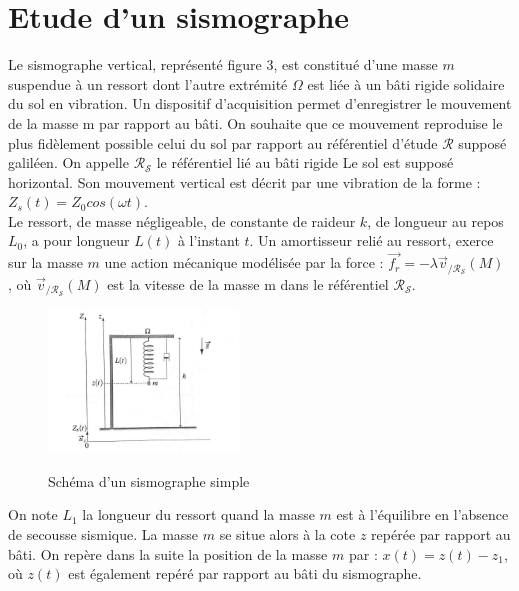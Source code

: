 \documentclass{article}
\begin{document}
\section{ Etude d'un sismographe}

Le sismographe vertical, représenté figure 3, est constitué d’une masse $m$ suspendue à
un ressort dont l’autre extrémité $\Omega$ est liée à un bâti rigide solidaire du sol en vibration. Un
dispositif d’acquisition permet d’enregistrer le mouvement de la masse m par rapport au bâti.
On souhaite que ce mouvement reproduise le plus fidèlement possible celui du sol par rapport
au référentiel d’étude $\mathcal{R}$ supposé galiléen. On appelle $\mathcal{R_S}$ le référentiel lié au bâti rigide
Le sol est supposé horizontal. Son mouvement vertical est décrit par une vibration de la
forme : $Z_s(t)= Z_0 cos(\omega t ).$ \\ 
Le ressort, de masse négligeable, de constante de raideur $k$, de longueur au repos $L_0$, a pour
longueur $L(t)$ à l’instant $t$. Un amortisseur relié au ressort, exerce sur la masse $m$ une action
mécanique modélisée par la force : $\vec{f_r}=-\lambda \vec{v}_{ / \mathcal{R_S}} (M) $ , où $\vec{v}_{ / \mathcal{R_S}} (M) $ est la vitesse de la masse
m dans le référentiel $\mathcal{R_S}$. 

\begin{figure}[h]
  \centering
  \includegraphics[width=0.45\textwidth]{sismographe.jpg}
  \label{fig:maison}
    \caption{Schéma d'un sismographe simple}
\end{figure}


On note $L_1$ la longueur du ressort quand la masse $m$ est à l’équilibre en l’absence de secousse
sismique. La masse $m$ se situe alors à la cote $z$ repérée par rapport au bâti. On repère dans la
suite la position de la masse $m$ par : $x(t) = z(t) - z_1$, où $z(t)$ est également repéré par rapport
au bâti du sismographe. 
\end{document}
